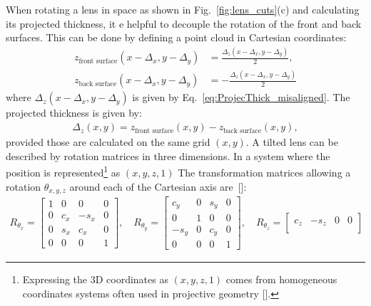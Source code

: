 \begin{refsection}
When rotating a lens in space as shown in Fig.~\ref{fig:lens_cuts}(c) and calculating its projected thickness, it  e helpful to decouple the rotation of the front and back surfaces. This can be done by defining a point cloud in Cartesian coordinates:
\begin{subequations}\label{eq:point_cloud}
    \begin{align}
    z_\text{front surface}(x-\Delta_x,y-\Delta_y) &=\frac{\Delta_z(x-\Delta_x,y-\Delta_y)}{2},\\
    z_\text{back surface}(x-\Delta_x,y-\Delta_y) &= -\frac{\Delta_z(x-\Delta_x,y-\Delta_y)}{2}
    \end{align}
\end{subequations}{}
where $\Delta_z(x-\Delta_x,y-\Delta_y)$ is given by Eq.~\ref{eq:ProjecThick_misaligned}. The projected thickness is given by:
\begin{align}\label{eq:point_cloud_thickness}
    \Delta_z(x,y) = z_\text{front surface}(x,y) - z_\text{back surface}(x,y),
\end{align}{}
provided those are calculated on the same grid $(x,y)$. A tilted lens can be described by rotation matrices in three dimensions. In a system where the position is represented\footnote{Expressing the 3D coordinates as $(x,y,z,1)$ comes from homogeneous coordinates systems often used in projective geometry [\cite{House2016}].} as $(x,y,z,1)$ The transformation matrices allowing a rotation $\theta_{x,y,z}$ around each of the Cartesian axis are~[\cite{House2016}]:
\begin{align}\label{eq:affine}
    R_{\theta_x}= \begin{bmatrix}
                        1 & 0 & 0 &0\\
                        0 & c_x & -s_x  &0\\
                        0 & s_x & c_x &0\\
                        0 & 0 & 0 &1
    \end{bmatrix} ,\quad
    R_{\theta_y} = \begin{bmatrix}
                    c_y & 0 & s_y &0\\
                    0 & 1 & 0 &0\\
                    -s_y & 0 & c_y &0\\
                    0 & 0 & 0 &1
    \end{bmatrix}  ,\quad
    R_{\theta_z} = \begin{bmatrix}
                    c_z & -s_z & 0 &0\\

\end{bmatrix}
\end{align}
\end{refsection}
